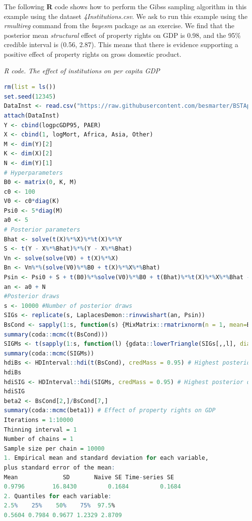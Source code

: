 The following \textbf{R} code shows how to perform the Gibss sampling algorithm in this example using the dataset \textit{4Institutions.csv}. We ask to run this example using the \textit{rmultireg} command from the \textit{bayesm} package as an exercise. We find that the posterior mean \textit{structural} effect of property rights on GDP is 0.98, and the 95\% credible interval is (0.56, 2.87). This means that there is evidence supporting a positive effect of property rights on gross domestic product. 

\begin{tcolorbox}[enhanced,width=4.67in,center upper,
	fontupper=\large\bfseries,drop shadow southwest,sharp corners]
	\textit{R code. The effect of institutions on per capita GDP}
	\begin{VF}
		\begin{lstlisting}[language=R]
rm(list = ls())
set.seed(12345)
DataInst <- read.csv("https://raw.githubusercontent.com/besmarter/BSTApp/refs/heads/master/DataApp/4Institutions.csv", sep = ",", header = TRUE, quote = "")
attach(DataInst)
Y <- cbind(logpcGDP95, PAER)
X <- cbind(1, logMort, Africa, Asia, Other)
M <- dim(Y)[2]
K <- dim(X)[2]
N <- dim(Y)[1]
# Hyperparameters
B0 <- matrix(0, K, M)
c0 <- 100
V0 <- c0*diag(K)
Psi0 <- 5*diag(M)
a0 <- 5
# Posterior parameters
Bhat <- solve(t(X)%*%X)%*%t(X)%*%Y 
S <- t(Y - X%*%Bhat)%*%(Y - X%*%Bhat)
Vn <- solve(solve(V0) + t(X)%*%X) 
Bn <- Vn%*%(solve(V0)%*%B0 + t(X)%*%X%*%Bhat)
Psin <- Psi0 + S + t(B0)%*%solve(V0)%*%B0 + t(Bhat)%*%t(X)%*%X%*%Bhat - t(Bn)%*%solve(Vn)%*%Bn
an <- a0 + N
#Posterior draws
s <- 10000 #Number of posterior draws
SIGs <- replicate(s, LaplacesDemon::rinvwishart(an, Psin))
BsCond <- sapply(1:s, function(s) {MixMatrix::rmatrixnorm(n = 1, mean=Bn, U = Vn,V = SIGs[,,s])})
summary(coda::mcmc(t(BsCond)))
SIGMs <- t(sapply(1:s, function(l) {gdata::lowerTriangle(SIGs[,,l], diag=TRUE, byrow=FALSE)}))
summary(coda::mcmc(SIGMs))
hdiBs <- HDInterval::hdi(t(BsCond), credMass = 0.95) # Highest posterior density credible interval
hdiBs
hdiSIG <- HDInterval::hdi(SIGMs, credMass = 0.95) # Highest posterior density credible interval
hdiSIG
beta2 <- BsCond[2,]/BsCond[7,] 
summary(coda::mcmc(beta1)) # Effect of property rights on GDP
Iterations = 1:10000
Thinning interval = 1 
Number of chains = 1 
Sample size per chain = 10000 
1. Empirical mean and standard deviation for each variable,
plus standard error of the mean:
Mean             SD       Naive SE Time-series SE 
0.9796        16.8430         0.1684         0.1684 
2. Quantiles for each variable:
2.5%    25%    50%    75%  97.5% 
0.5604 0.7984 0.9677 1.2329 2.8709 
\end{lstlisting}
	\end{VF}
\end{tcolorbox} 

